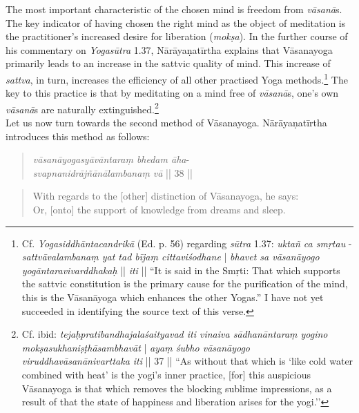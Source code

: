 The most important characteristic of the chosen mind is freedom from \textit{vāsanā}s. The key indicator of having chosen the right mind as the object of meditation is the practitioner's increased desire for liberation (\textit{mokṣa}). In the further course of his commentary on \emph{Yogasūtra} 1.37, Nārāyaṇatīrtha explains that Vāsanayoga primarily leads to an increase in the sattvic quality of mind. This increase of \emph{sattva}, in turn, increases the efficiency of all other practised Yoga methods.\footnote{Cf. \textit{Yogasiddhāntacandrikā} (Ed. p. 56) regarding \textit{sūtra} 1.37: \textit{uktañ ca smṛtau} - \textit{sattvāvalambanaṃ yat tad bījaṃ cittaviśodhane} | \textit{bhavet sa vāsanāyogo yogāntaravivarddhakaḥ} || \textit{iti} || ``It is said in the Smṛti: That which supports the sattvic constitution is the primary cause for the purification of the mind, this is the Vāsanāyoga which enhances the other Yogas.'' I have not yet succeeded in identifying the source text of this verse.} The key to this practice is that by meditating on a mind free of \textit{vāsanā}s, one's own \textit{vāsanā}s are naturally extinguished.\footnote{Cf. ibid: \textit{tejaḥpratibandhajalaśaityavad iti vinaiva sādhanāntaraṃ yogino mokṣasukhaniṣṭhāsambhavāt} | \textit{ayaṃ śubho vāsanāyogo viruddhavāsanānivarttaka iti} || 37 || ``As without that which is `like cold water combined with heat’ is the yogi's inner practice, [for] this auspicious Vāsanayoga is that which removes the blocking sublime impressions, as a result of that the state of happiness and liberation arises for the yogi.''}\\

Let us now turn towards the second method of Vāsanayoga. Nārāyaṇatīrtha introduces this method as follows:
\begin{quote}
\textit{vāsanāyogasyāvāntaraṃ bhedam āha}-\\
\textit{svapnanidrājñānālambanaṃ vā} || 38 ||
\end{quote}
\begin{quote}
With regards to the [other] distinction of Vāsanayoga, he says:\\ 
Or, [onto] the support of knowledge from dreams and sleep. 
\end{quote}

